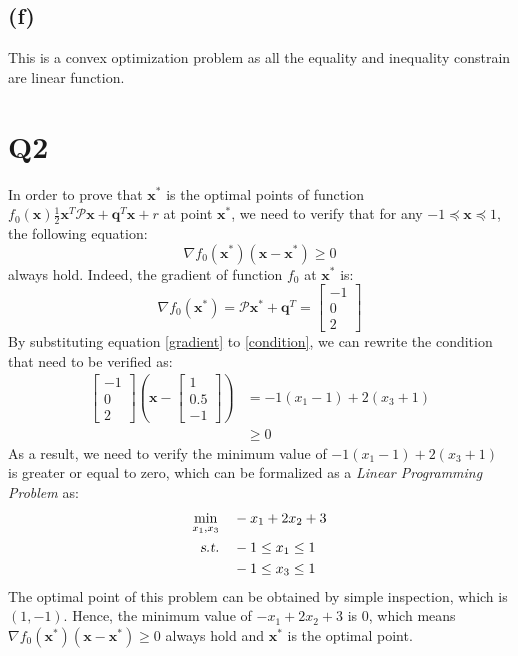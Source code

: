 \documentclass[10pt,a4paper]{article}
\begin{document}
\subsection*{(f)}
This is a convex optimization problem as all the equality and inequality constrain are linear function.

\section*{Q2}
In order to prove that $\mathbf{x}^{*}$ is the optimal points of function $f_{0}(\mathbf{x})\frac{1}{2} \mathbf{x}^{T} \mathcal{P} \mathbf{x} + \mathbf{q}^{T} \mathbf{x} + r$ at point $\mathbf{x}^{*}$, we need to verify that for any $-1 \preceq \mathbf{x} \preceq 1$, the following equation:
\begin{equation}
	\nabla f_{0}(\mathbf{x}^{*})(\mathbf{x} - \mathbf{x}^{*}) \geq 0
	\label{condition}
\end{equation}
always hold. Indeed, the gradient of function $f_{0}$ at $\mathbf{x}^{*}$ is:
\begin{equation}
	\nabla f_{0}(\mathbf{x}^{*}) = \mathcal{P} \mathbf{x}^{*} + \mathbf{q}^{T} = 		\begin{bmatrix}
	-1 \\
	0\\
	2
	\end{bmatrix}
	\label{gradient}
\end{equation}
By substituting equation \ref{gradient} to \ref{condition}, we can rewrite the condition that need to be verified as:
\begin{equation}
	\begin{aligned}
		\begin{bmatrix}
			-1 \\
			0 \\
			2
		\end{bmatrix} (\mathbf{x} - \begin{bmatrix}
		1 \\
		0.5 \\
		-1
		\end{bmatrix}) &= -1(x_{1} - 1) + 2(x_{3} + 1) \\
		& \geq 0
	\end{aligned}
\end{equation}
As a result, we need to verify the minimum value of $-1(x_{1} - 1) + 2(x_{3} + 1)$ is greater or equal to zero, which can be formalized as a \textit{Linear Programming Problem} as:
\begin{equation}
	\begin{aligned}
		\displaystyle\min_{x_{1}, x_{3}} \quad & -x_{1} + 2x_{2} + 3 \\
		\textsl{s.t.} \quad & -1 \leq x_{1} \leq 1 \\
		& -1 \leq x_{3} \leq 1
	\end{aligned}
\end{equation}
The optimal point of this problem can be obtained by simple inspection, which is $(1, -1)$. Hence, the minimum value of $-x_{1} + 2x_{2} + 3$ is 0, which means $\nabla f_{0}(\mathbf{x}^{*})(\mathbf{x} - \mathbf{x}^{*}) \geq 0$ always hold and $\mathbf{x}^{*}$ is the optimal point.
\end{document}
